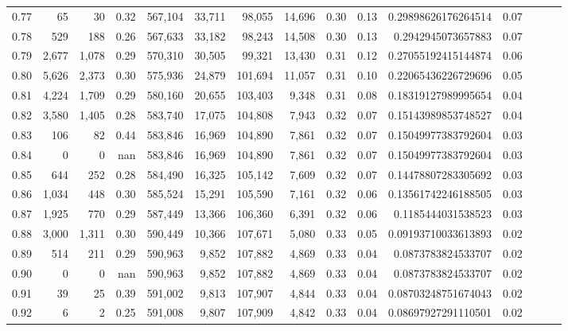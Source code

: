 \begin{tabular}{rrrrrrrrrrrrrrr}
0.77 &      65 &      30 &  0.32 &  567,104 &   33,711 &   98,055 &   14,696 &  0.30 &  0.13 &  0.29898626176264514 &      0.07 \\
0.78 &     529 &     188 &  0.26 &  567,633 &   33,182 &   98,243 &   14,508 &  0.30 &  0.13 &   0.2942945073657883 &      0.07 \\
0.79 &   2,677 &   1,078 &  0.29 &  570,310 &   30,505 &   99,321 &   13,430 &  0.31 &  0.12 &  0.27055192415144874 &      0.06 \\
0.80 &   5,626 &   2,373 &  0.30 &  575,936 &   24,879 &  101,694 &   11,057 &  0.31 &  0.10 &  0.22065436226729696 &      0.05 \\
0.81 &   4,224 &   1,709 &  0.29 &  580,160 &   20,655 &  103,403 &    9,348 &  0.31 &  0.08 &  0.18319127989995654 &      0.04 \\
0.82 &   3,580 &   1,405 &  0.28 &  583,740 &   17,075 &  104,808 &    7,943 &  0.32 &  0.07 &  0.15143989853748527 &      0.04 \\
0.83 &     106 &      82 &  0.44 &  583,846 &   16,969 &  104,890 &    7,861 &  0.32 &  0.07 &  0.15049977383792604 &      0.03 \\
0.84 &       0 &       0 &   nan &  583,846 &   16,969 &  104,890 &    7,861 &  0.32 &  0.07 &  0.15049977383792604 &      0.03 \\
0.85 &     644 &     252 &  0.28 &  584,490 &   16,325 &  105,142 &    7,609 &  0.32 &  0.07 &  0.14478807283305692 &      0.03 \\
0.86 &   1,034 &     448 &  0.30 &  585,524 &   15,291 &  105,590 &    7,161 &  0.32 &  0.06 &  0.13561742246188505 &      0.03 \\
0.87 &   1,925 &     770 &  0.29 &  587,449 &   13,366 &  106,360 &    6,391 &  0.32 &  0.06 &   0.1185444031538523 &      0.03 \\
0.88 &   3,000 &   1,311 &  0.30 &  590,449 &   10,366 &  107,671 &    5,080 &  0.33 &  0.05 &  0.09193710033613893 &      0.02 \\
0.89 &     514 &     211 &  0.29 &  590,963 &    9,852 &  107,882 &    4,869 &  0.33 &  0.04 &   0.0873783824533707 &      0.02 \\
0.90 &       0 &       0 &   nan &  590,963 &    9,852 &  107,882 &    4,869 &  0.33 &  0.04 &   0.0873783824533707 &      0.02 \\
0.91 &      39 &      25 &  0.39 &  591,002 &    9,813 &  107,907 &    4,844 &  0.33 &  0.04 &  0.08703248751674043 &      0.02 \\
0.92 &       6 &       2 &  0.25 &  591,008 &    9,807 &  107,909 &    4,842 &  0.33 &  0.04 &  0.08697927291110501 &      0.02 \\

\end{tabular}
